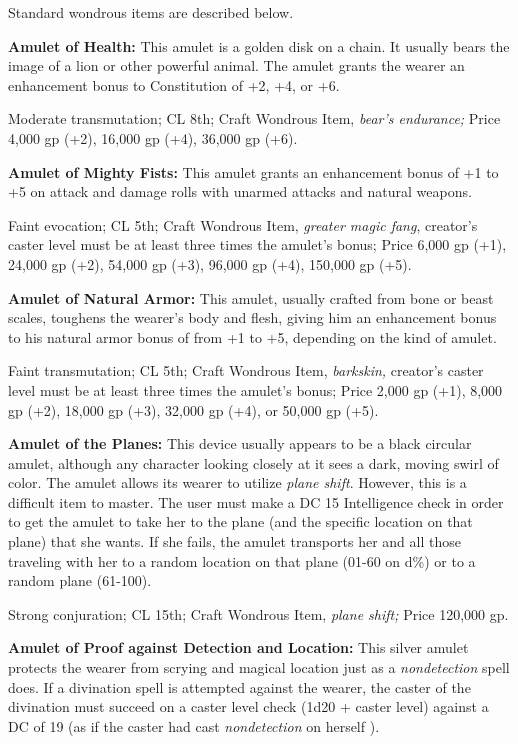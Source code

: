 \documentclass{article}
\begin{document}
Standard wondrous items are described below.

\textbf{Amulet of Health:} This amulet is a golden disk on a chain. It usually 
bears the image of a lion or other powerful animal. The amulet grants the wearer 
an enhancement bonus to Constitution of +2, +4, or +6.

Moderate transmutation; CL 8th; Craft Wondrous Item, \textit{bear's endurance; 
}Price 4,000 gp (+2), 16,000 gp (+4), 36,000 gp (+6).

\textbf{Amulet of Mighty Fists:} This amulet grants an enhancement bonus of +1 
to +5 on attack and damage rolls with unarmed attacks and natural weapons.

Faint evocation; CL 5th; Craft Wondrous Item, \textit{greater magic fang}, creator's 
caster level must be at least three times the amulet's bonus; Price 6,000 gp (+1), 
24,000 gp (+2), 54,000 gp (+3), 96,000 gp (+4), 150,000 gp (+5).

\textbf{Amulet of Natural Armor:} This amulet, usually crafted from bone or beast 
scales, toughens the wearer's body and flesh, giving him an enhancement bonus to 
his natural armor bonus of from +1 to +5, depending on the kind of amulet.

Faint transmutation; CL 5th; Craft Wondrous Item, \textit{barkskin, }creator's 
caster level must be at least three times the amulet's bonus; Price 2,000 gp (+1), 
8,000 gp (+2), 18,000 gp (+3), 32,000 gp (+4), or 50,000 gp (+5).

\textbf{Amulet of the Planes:} This device usually appears to be a black circular 
amulet, although any character looking closely at it sees a dark, moving swirl 
of color. The amulet allows its wearer to utilize \textit{plane shift}. However, 
this is a difficult item to master. The user must make a DC 15 Intelligence check 
in order to get the amulet to take her to the plane (and the specific location 
on that plane) that she wants. If she fails, the amulet transports her and all 
those traveling with her to a random location on that plane (01-60 on d\%) or to 
a random plane (61-100).

Strong conjuration; CL 15th; Craft Wondrous Item, \textit{plane shift; }Price 120,000 
gp.

\textbf{Amulet of Proof against Detection and Location:} This silver amulet protects 
the wearer from scrying and magical location just as a \textit{nondetection }spell 
does. If a divination spell is attempted against the wearer, the caster of the 
divination must succeed on a caster level check (1d20 + caster level) against a 
DC of 19 (as if the caster had cast \textit{nondetection }on herself ).
\end{document}
